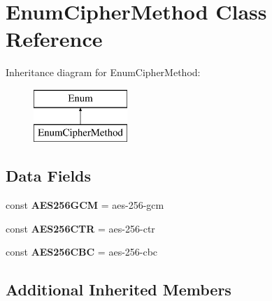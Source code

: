\hypertarget{class_pes_1_1_security_1_1_cryptor_1_1_enum_cipher_method}{}\section{Enum\+Cipher\+Method Class Reference}
\label{class_pes_1_1_security_1_1_cryptor_1_1_enum_cipher_method}
Inheritance diagram for Enum\+Cipher\+Method\+:\begin{figure}[H]
\begin{center}
\leavevmode
\includegraphics[height=2.000000cm]{class_pes_1_1_security_1_1_cryptor_1_1_enum_cipher_method}
\end{center}
\end{figure}
\subsection*{Data Fields}
\begin{DoxyCompactItemize}
\item 
\mbox{\label{class_pes_1_1_security_1_1_cryptor_1_1_enum_cipher_method_a06c0fe6be3af518233f0d1bc224b1cce}} 
const {\bfseries A\+E\+S256\+G\+CM} = \textquotesingle{}aes-\/256-\/gcm\textquotesingle{}
\item 
\mbox{\label{class_pes_1_1_security_1_1_cryptor_1_1_enum_cipher_method_a1c6c9e844c2afcf817c9e0efec434eca}} 
const {\bfseries A\+E\+S256\+C\+TR} = \textquotesingle{}aes-\/256-\/ctr\textquotesingle{}
\item 
\mbox{\label{class_pes_1_1_security_1_1_cryptor_1_1_enum_cipher_method_ac5fb684a783e0ff96f6709d8d5fe4ece}} 
const {\bfseries A\+E\+S256\+C\+BC} = \textquotesingle{}aes-\/256-\/cbc\textquotesingle{}
\end{DoxyCompactItemize}
\subsection*{Additional Inherited Members}


